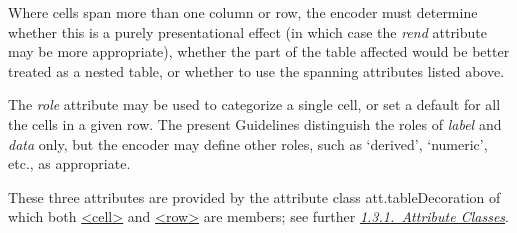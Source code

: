 Where cells span more than one column or row, the encoder must determine whether this is a purely presentational effect (in which case the {\itshape rend} attribute may be more appropriate), whether the part of the table affected would be better treated as a nested table, or whether to use the spanning attributes listed above.\par
The {\itshape role} attribute may be used to categorize a single cell, or set a default for all the cells in a given row. The present Guidelines distinguish the roles of \textit{label} and \textit{data} only, but the encoder may define other roles, such as ‘derived’, ‘numeric’, etc., as appropriate.\par
These three attributes are provided by the attribute class \textsf{att.tableDecoration} of which both \hyperref[TEI.cell]{<cell>} and \hyperref[TEI.row]{<row>} are members; see further \textit{\hyperref[STECAT]{1.3.1.\ Attribute Classes}}.\par
